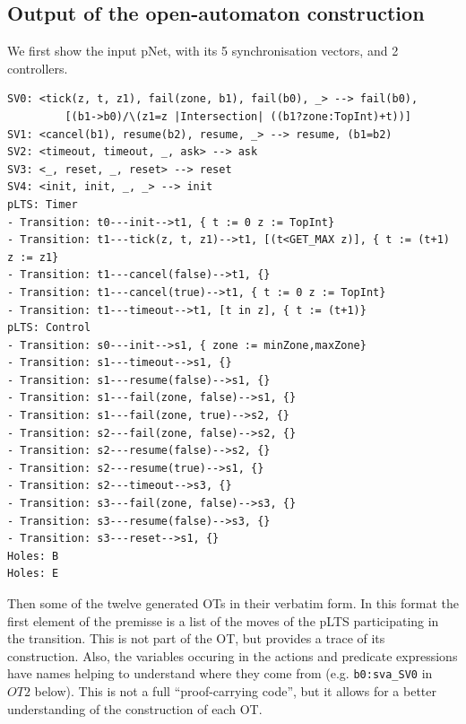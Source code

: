 \documentclass{llncs}
\makeatletter
\newcommand{\verbatimfont}[1]{\renewcommand{\verbatim@font}{\ttfamily#1}}
\makeatother
\begin{document}
\subsection{Output of the open-automaton construction}
\label{secn:full-results}



We first show the input pNet, with its 5 synchronisation vectors, and 2 controllers.

\noindent
\verbatimfont{\small}
\begin{verbatim}
SV0: <tick(z, t, z1), fail(zone, b1), fail(b0), _> --> fail(b0),
         [(b1->b0)/\(z1=z |Intersection| ((b1?zone:TopInt)+t))]
SV1: <cancel(b1), resume(b2), resume, _> --> resume, (b1=b2)
SV2: <timeout, timeout, _, ask> --> ask
SV3: <_, reset, _, reset> --> reset
SV4: <init, init, _, _> --> init
pLTS: Timer
- Transition: t0---init-->t1, { t := 0 z := TopInt}
- Transition: t1---tick(z, t, z1)-->t1, [(t<GET_MAX z)], { t := (t+1) z := z1}
- Transition: t1---cancel(false)-->t1, {}
- Transition: t1---cancel(true)-->t1, { t := 0 z := TopInt}
- Transition: t1---timeout-->t1, [t in z], { t := (t+1)}
pLTS: Control
- Transition: s0---init-->s1, { zone := minZone,maxZone}
- Transition: s1---timeout-->s1, {}
- Transition: s1---resume(false)-->s1, {}
- Transition: s1---fail(zone, false)-->s1, {}
- Transition: s1---fail(zone, true)-->s2, {}
- Transition: s2---fail(zone, false)-->s2, {}
- Transition: s2---resume(false)-->s2, {}
- Transition: s2---resume(true)-->s1, {}
- Transition: s2---timeout-->s3, {}
- Transition: s3---fail(zone, false)-->s3, {}
- Transition: s3---resume(false)-->s3, {}
- Transition: s3---reset-->s1, {}
Holes: B
Holes: E
\end{verbatim}

Then some of the twelve generated OTs in their verbatim form. In this format
the first element of the premisse is a list of the moves of the pLTS
participating in the transition. This is not part of the OT, but
provides a trace of its construction. Also, the variables occuring in
the actions and predicate expressions have names helping to understand
where they come from (e.g. \verb|b0:sva_SV0| in $OT2$ below).
This is not a full ``proof-carrying
code'', but it allows for a better understanding of the construction
of each OT.
\end{document}
